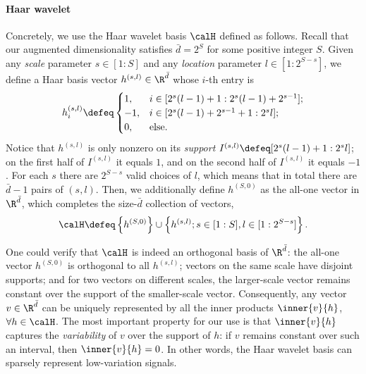 \documentclass[10pt]{article}
\begin{document}
\paragraph{Haar wavelet} Concretely, we use the Haar wavelet basis $\calH$ defined as follows. Recall that our augmented dimensionality satisfies $\bar d=2^S$ for some positive integer $S$. Given any \emph{scale} parameter $s\in[1:S]$ and any \emph{location} parameter $l\in[1:2^{S-s}]$, we define a Haar basis vector $h^{(s,l)}\in\R^{\bar d}$ whose $i$-th entry is
\begin{equation*}
h^{(s,l)}_i\defeq\begin{cases}
1,& i\in[2^s(l-1)+1: 2^s(l-1)+2^{s-1}];\\
-1,& i\in[2^s(l-1)+2^{s-1}+1: 2^sl];\\
0,&\textrm{else}.
\end{cases}
\end{equation*}
Notice that $h^{(s,l)}$ is only nonzero on its \emph{support} $I^{(s,l)}\defeq[2^s(l-1)+1:2^sl]$; on the first half of $I^{(s,l)}$ it equals $1$, and on the second half of $I^{(s,l)}$ it equals $-1$. For each $s$ there are $2^{S-s}$ valid choices of $l$, which means that in total there are $\bar d-1$ pairs of $(s,l)$. Then, we additionally define $h^{(S,0)}$ as the all-one vector in $\R^{\bar d}$, which completes the size-$\bar d$ collection of vectors,
\begin{equation*}
\calH\defeq\left\{h^{(S,0)}\right\}\cup\left\{h^{(s,l)};s\in[1:S], l\in[1:2^{S-s}]\right\}.
\end{equation*}

One could verify that $\calH$ is indeed an orthogonal basis of $\R^{\bar d}$: the all-one vector $h^{(S,0)}$ is orthogonal to all $h^{(s,l)}$; vectors on the same scale have disjoint supports; and for two vectors on different scales, the larger-scale vector remains constant over the support of the smaller-scale vector. Consequently, any vector $v\in\R^{\bar d}$ can be uniquely represented by all the inner products $\inner{v}{h}$, $\forall h\in\calH$. The most important property for our use is that $\inner{v}{h}$ captures the \emph{variability} of $v$ over the support of $h$: if $v$ remains constant over such an interval, then $\inner{v}{h}=0$. In other words, the Haar wavelet basis can sparsely represent low-variation signals. 
\end{document}

